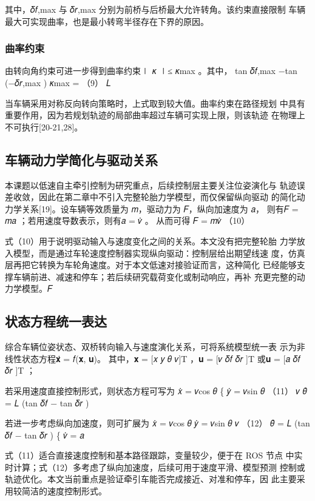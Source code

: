 其中，𝛿𝑓,max 与 𝛿𝑟,max 分别为前桥与后桥最大允许转角。该约束直接限制
车辆最大可实现曲率，也是最小转弯半径存在下界的原因。
\subsubsection{曲率约束}
由转向角约束可进一步得到曲率约束∣ 𝜅 ∣≤ 𝜅max 。其中，
tan 𝛿𝑓,max −tan (−𝛿𝑟,max )
𝜅max =                                               （9）
𝐿


当车辆采用对称反向转向策略时，上式取到较大值。曲率约束在路径规划
中具有重要作用，因为若规划轨迹的局部曲率超过车辆可实现上限，则该轨迹
在物理上不可执行[20-21,28]。
\subsection{车辆动力学简化与驱动关系}
本课题以低速自主牵引控制为研究重点，后续控制层主要关注位姿演化与
轨迹误差收敛，因此在第二章中不引入完整轮胎力学模型，而仅保留纵向驱动
的简化动力学关系[19]。设车辆等效质量为 𝑚，驱动力为 𝐹，纵向加速度为 𝑎，
则有𝐹 = 𝑚𝑎 ；若用速度导数表示，则有𝑎 = 𝑣̇ 。
从而可得
𝐹 = 𝑚𝑣̇                                  （10）

式（10）用于说明驱动输入与速度变化之间的关系。本文没有把完整轮胎
力学放入模型，而是通过车轮速度控制器实现纵向驱动：控制层给出期望线速
度，仿真层再把它转换为车轮角速度。对于本文低速对接验证而言，这种简化
已经能够支撑车辆前进、减速和停车；若后续研究载荷变化或制动响应，再补
充更完整的动力学模型。𝐹
\subsection{状态方程统一表达}
综合车辆位姿状态、双桥转向输入与速度演化关系，可将系统模型统一表
示为非线性状态方程𝐱̇ = 𝑓(𝐱, 𝐮)。
其中，𝐱 = [𝑥   𝑦   𝜃   𝑣]T ，𝐮 = [𝑣     𝛿𝑓   𝛿𝑟 ]T 或𝐮 = [𝑎      𝛿𝑓   𝛿𝑟 ]T ；








若采用速度直接控制形式，则状态方程可写为
𝑥̇ = 𝑣cos 𝜃
\{       𝑦̇ = 𝑣sin 𝜃              （11）
𝑣
𝜃̇ = 𝐿 (tan 𝛿𝑓 − tan 𝛿𝑟 )


若进一步考虑纵向加速度，则可扩展为
𝑥̇ = 𝑣cos 𝜃
𝑦̇ = 𝑣sin 𝜃
𝑣                                  （12）
𝜃̇ = 𝐿 (tan 𝛿𝑓 − tan 𝛿𝑟 )
\{          𝑣̇ = 𝑎

式（11）适合直接速度控制和基本路径跟踪，变量较少，便于在 ROS 节点
中实时计算；式（12）多考虑了纵向加速度，后续可用于速度平滑、模型预测
控制或轨迹优化。本文当前重点是验证牵引车能否完成接近、对准和停车，因
此主要采用较简洁的速度控制形式。
